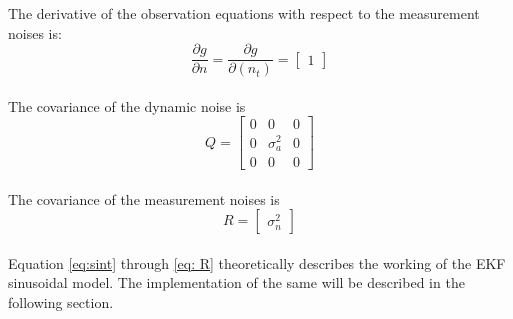 \documentclass[12pt]{article}
\begin{document}
\indent
The derivative of the observation equations with respect to the measurement noises is:
\begin{equation}
\frac{\partial g}{\partial n} =
\frac{\partial g}{\partial (n_t)} =
\begin{bmatrix}
1 
\end{bmatrix}
\label{eq: Dgn}
\end{equation}
\\ \indent
The covariance of the dynamic noise is
\begin{equation}
Q = \begin{bmatrix}
0 & 0 & 0  \\
0 & \sigma_a^2 & 0  \\
0 & 0 & 0 
\end{bmatrix}
\label{eq: Q}
\end{equation}
\\ \indent
The covariance of the measurement noises is
\begin{equation}
R = \begin{bmatrix}
\sigma_n^2
\end{bmatrix}
\label{eq: R}
\end{equation}
\\ \indent
Equation \ref{eq:sint} through \ref{eq: R} theoretically describes the working of the EKF sinusoidal model. The implementation of the same will be described in the following section.
\end{document}

